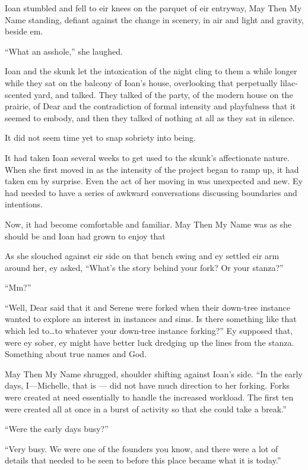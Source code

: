 Ioan stumbled and fell to eir knees on the parquet of eir entryway, May Then My Name standing, defiant against the change in scenery, in air and light and gravity, beside em.

``What an asshole,'' she laughed.

Ioan and the skunk let the intoxication of the night cling to them a while longer while they sat on the balcony of Ioan's house, overlooking that perpetually lilac-scented yard, and talked. They talked of the party, of the modern house on the prairie, of Dear and the contradiction of formal intensity and playfulness that it seemed to embody, and then they talked of nothing at all as they sat in silence.

It did not seem time yet to snap sobriety into being.

It had taken Ioan several weeks to get used to the skunk's affectionate nature. When she first moved in as the intensity of the project began to ramp up, it had taken em by surprise. Even the act of her moving in was unexpected and new. Ey had needed to have a series of awkward conversations discussing boundaries and intentions.

Now, it had become comfortable and familiar. May Then My Name was as she should be and Ioan had grown to enjoy that

As she slouched against eir side on that bench swing and ey settled eir arm around her, ey asked, ``What's the story behind your fork? Or your stanza?''

``Mm?''

``Well, Dear said that it and Serene were forked when their down-tree instance wanted to explore an interest in instances and sims. Is there something like that which led to\ldots to whatever your down-tree instance forking?'' Ey supposed that, were ey sober, ey might have better luck dredging up the lines from the stanza. Something about true names and God.

May Then My Name shrugged, shoulder shifting against Ioan's side. ``In the early days, I---Michelle, that is — did not have much direction to her forking. Forks were created at need essentially to handle the increased workload. The first ten were created all at once in a burst of activity so that she could take a break.''

``Were the early days busy?''

``Very busy. We were one of the founders you know, and there were a lot of details that needed to be seen to before this place became what it is today.''

